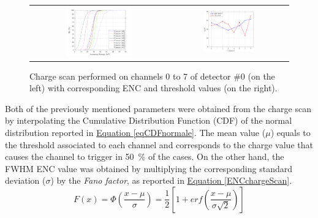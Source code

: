 \begin{figure}[h!]
    \centering
    \begin{tabular}{cc}
        \includegraphics[width=0.505\textwidth]{Images/chap3/results/americio/Threshold Scan - Detector 0 - TH214.pdf} & \includegraphics[width=0.44\textwidth]{Images/chap3/results/americio/ENC_channels.pdf}\\
    \end{tabular}
    \caption{Charge scan performed on channels 0 to 7 of detector \#0 (on the left) with corresponding ENC and threshold values (on the right).}
    \label{figChargeScan}
\end{figure}

\par
Both of the previously mentioned parameters were obtained from the charge scan by interpolating the Cumulative Distribution Function (CDF) of the normal distribution reported in \hyperref[eqCDFnormale]{Equation \ref{eqCDFnormale}}. The mean value ($\mu$) equals to the threshold associated to each channel and corresponds to the charge value that causes the channel to trigger in \SI{50}{\percent} of the cases. On the other hand, the FWHM ENC value was obtained by multiplying the corresponding standard deviation ($\sigma$) by the \textit{Fano factor}, as reported in \hyperref[ENCchargeScan]{Equation \ref{ENCchargeScan}}. \\

\begin{equation}
    F(x) = \Phi \left(\frac{x-\mu}{\sigma}\right) = \frac{1}{2} \left[ 1 + erf \left( \frac{x-\mu}{\sigma \sqrt{2}} \right) \right]
    \label{eqCDFnormale}
\end{equation}

